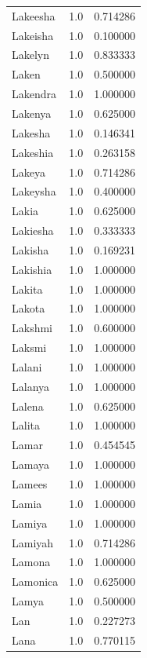 \documentclass[
  letterpaper,
  DIV=11,
  numbers=noendperiod]{scrreprt}
\begin{document}
\begin{tabular}{lrr}
Lakeesha        &   1.0 &   0.714286 \\
Lakeisha        &   1.0 &   0.100000 \\
Lakelyn         &   1.0 &   0.833333 \\
Laken           &   1.0 &   0.500000 \\
Lakendra        &   1.0 &   1.000000 \\
Lakenya         &   1.0 &   0.625000 \\
Lakesha         &   1.0 &   0.146341 \\
Lakeshia        &   1.0 &   0.263158 \\
Lakeya          &   1.0 &   0.714286 \\
Lakeysha        &   1.0 &   0.400000 \\
Lakia           &   1.0 &   0.625000 \\
Lakiesha        &   1.0 &   0.333333 \\
Lakisha         &   1.0 &   0.169231 \\
Lakishia        &   1.0 &   1.000000 \\
Lakita          &   1.0 &   1.000000 \\
Lakota          &   1.0 &   1.000000 \\
Lakshmi         &   1.0 &   0.600000 \\
Laksmi          &   1.0 &   1.000000 \\
Lalani          &   1.0 &   1.000000 \\
Lalanya         &   1.0 &   1.000000 \\
Lalena          &   1.0 &   0.625000 \\
Lalita          &   1.0 &   1.000000 \\
Lamar           &   1.0 &   0.454545 \\
Lamaya          &   1.0 &   1.000000 \\
Lamees          &   1.0 &   1.000000 \\
Lamia           &   1.0 &   1.000000 \\
Lamiya          &   1.0 &   1.000000 \\
Lamiyah         &   1.0 &   0.714286 \\
Lamona          &   1.0 &   1.000000 \\
Lamonica        &   1.0 &   0.625000 \\
Lamya           &   1.0 &   0.500000 \\
Lan             &   1.0 &   0.227273 \\
Lana            &   1.0 &   0.770115 \\

\end{tabular}
\end{document}
